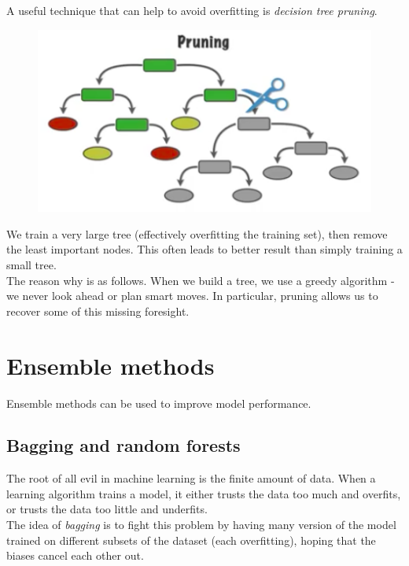 A useful technique that can help to avoid overfitting is \textit{decision tree pruning}. 
\begin{figure}[H]
\centering
\includegraphics[scale=0.4]{pruning.png}
\end{figure}
We train a very large tree (effectively overfitting the training set), then remove the least important nodes. This often leads to better result than simply training a small tree.\\

The reason why is as follows. When we build a tree, we use a greedy algorithm - we never look ahead or plan smart moves. In particular, pruning allows us to recover some of this missing foresight.









\newpage
\section{Ensemble methods}

Ensemble methods can be used to improve model performance. 

\subsection{Bagging and random forests}

The root of all evil in machine learning is the finite amount of data. When a learning algorithm trains a model, it either trusts the data too much and overfits, or trusts the data too little and underfits.\\

The idea of \textit{bagging} is to fight this problem by having many version of the model trained on different subsets of the dataset (each overfitting), hoping that the biases cancel each other out.\\

